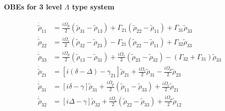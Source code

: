 \documentclass[9pt,aspectratio94]{beamer}
\begin{document}
     
   \begin{frame}{\textbf{OBEs for 3 level $\Lambda$ type system}}
      \begin{tcolorbox}[colback= blue!5]
          \begin{eqnarray*}
\begin{aligned}
\dot{\tilde{\rho}}_{11}&= \frac{i\Omega_{p}}{2} (\tilde{\rho}_{31} -\tilde{\rho}_{13}) + \Gamma_{21} (\tilde{\rho}_{22} -\tilde{\rho}_{11}) + \Gamma_{31} \tilde{\rho}_{33}\\
\dot{\tilde{\rho }}_{22}&= \frac{i\Omega_{c}}{2} (\tilde{\rho}_{32} -\tilde{\rho}_{23}) - \Gamma_{21} (\tilde{\rho}_{22} -\tilde{\rho}_{11}) + \Gamma_{32} \tilde{\rho}_{33}\\
\dot{\tilde{\rho }}_{33}&= \frac{i\Omega_{p}}{2} (\tilde{\rho}_{13} -\tilde{\rho}_{31}) + \frac{i\Omega_{c}}{2} (\tilde{\rho}_{23} -\tilde{\rho}_{32}) - (\Gamma_{32} + \Gamma_{31}) \tilde{\rho}_{33}\\
\dot{\tilde{\rho }}_{21}&= [ i (\delta - \Delta)-\gamma_{21}]\tilde{\rho}_{21} + \frac{i\Omega_{c}}{2} \tilde{\rho}_{31} - \frac{i\Omega_{p}}{2} \tilde{\rho}_{23}\\
\dot{\tilde{\rho }}_{31}&= [ i \delta - \gamma]\tilde{\rho}_{31} + \frac{i\Omega_{p}}{2} (\tilde{\rho}_{11} - \tilde{\rho}_{33}) + \frac{i\Omega_{c}}{2} \tilde{\rho}_{21}\\
\dot{\tilde{\rho }}_{32}&= [ i\Delta-\gamma]\tilde{\rho}_{32} + \frac{i\Omega_{c}}{2} (\tilde{\rho}_{22} - \tilde{\rho}_{33})+ \frac{i\Omega_{p}}{2} \tilde{\rho}_{12}
\end{aligned}
\end{eqnarray*}
\end{tcolorbox}

   \end{frame} 
\end{document}

